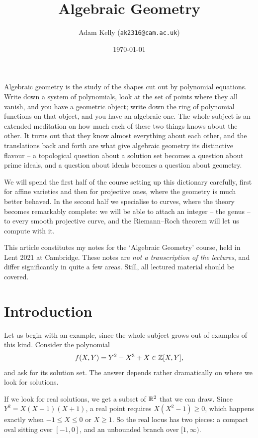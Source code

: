 \documentclass[a4paper]{scrartcl}
\title{Algebraic Geometry}
\author{Adam Kelly (\texttt{ak2316@cam.ac.uk})}
\date{\today}
\begin{document}
\maketitle

Algebraic geometry is the study of the shapes cut out by polynomial equations. Write down a system of polynomials, look at the set of points where they all vanish, and you have a geometric object; write down the ring of polynomial functions on that object, and you have an algebraic one. The whole subject is an extended meditation on how much each of these two things knows about the other. It turns out that they know almost everything about each other, and the translations back and forth are what give algebraic geometry its distinctive flavour -- a topological question about a solution set becomes a question about prime ideals, and a question about ideals becomes a question about geometry.

We will spend the first half of the course setting up this dictionary carefully, first for affine varieties and then for projective ones, where the geometry is much better behaved. In the second half we specialise to curves, where the theory becomes remarkably complete: we will be able to attach an integer -- the genus -- to every smooth projective curve, and the Riemann--Roch theorem will let us compute with it.

This article constitutes my notes for the `Algebraic Geometry' course, held in Lent 2021 at Cambridge. These notes are \emph{not a transcription of the lectures}, and differ significantly in quite a few areas. Still, all lectured material should be covered.

\tableofcontents

\section{Introduction}

Let us begin with an example, since the whole subject grows out of examples of this kind. Consider the polynomial
$$f(X,Y) = Y^2 - X^3 + X \in \mathbb{Z}[X,Y],$$
and ask for its solution set. The answer depends rather dramatically on where we look for solutions.

If we look for real solutions, we get a subset of $\mathbb{R}^2$ that we can draw. Since $Y^2 = X(X-1)(X+1)$, a real point requires $X(X^2-1) \geq 0$, which happens exactly when $-1 \leq X \leq 0$ or $X \geq 1$. So the real locus has two pieces: a compact oval sitting over $[-1,0]$, and an unbounded branch over $[1,\infty)$.
\end{document}
